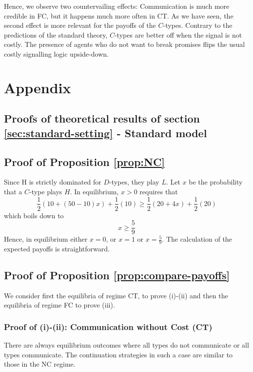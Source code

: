\documentclass[12pt]{article}
\theoremstyle{break}
\begin{document}
Hence, we observe two countervailing effects: Communication is much more credible in FC, but it happens much more often in CT. As we have seen, the second effect is more relevant for the payoffs of the $C$-types. Contrary to the predictions of the standard theory, $C$-types are better off when the signal is not costly. The presence of agents who do not want to break promises flips the usual costly signalling logic upside-down.




%   
%    
\appendix
\section{Appendix}
\subsection{Proofs of theoretical results of section \ref{sec:standard-setting} - Standard model}
\subsection*{Proof of Proposition \ref{prop:NC}}
Since H is strictly dominated for $D$-types, they play $L$. Let $x$ be the probability that a $C$-type plays $H$. In equilibrium, $x>0$ requires that
\[
	\frac{1}{2}(10+(50-10)x)+\frac{1}{2}(10)\geq \frac{1}{2}(20+4 x)+\frac{1}{2}(20)
\]
which boils down to\[
x\geq \frac{5}{9}
	\]
Hence, in equilibrium either $x=0$, or $x=1$ or $x=\frac{5}{9}$. The calculation of the expected payoffs is straightforward. 


\subsection*{Proof of Proposition \ref{prop:compare-payoffs}}
We consider first the equilibria of regime CT, to prove (i)-(ii) and then the equilibria of regime FC to prove (iii).
%
\subsubsection*{Proof of (i)-(ii): Communication without Cost (CT)}
There are always equilibrium outcomes where all types do not communicate or all types communicate. The continuation strategies in such a case are similar to those in the NC regime.
\end{document}
